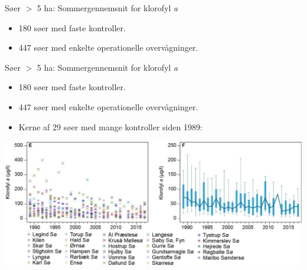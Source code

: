 \begin{frame}{Søer $>$ 5 ha: Sommergennemsnit for klorofyl \textit{a}}
  \begin{itemize}
    \item 180 søer med faste kontroller.
    \item 447 søer med enkelte operationelle overvågninger.
  \end{itemize}
  \vfill
\end{frame}
\begin{frame}{Søer $>$ 5 ha: Sommergennemsnit for klorofyl \textit{a}}
  \begin{itemize}
    \item 180 søer med faste kontroller.
    \item 447 søer med enkelte operationelle overvågninger.
    \item Kerne af 29 søer med mange kontroller siden 1989:
  \end{itemize}
  \includegraphics[width=\textwidth]{figures/chlorophyll_lakes}
\end{frame}

